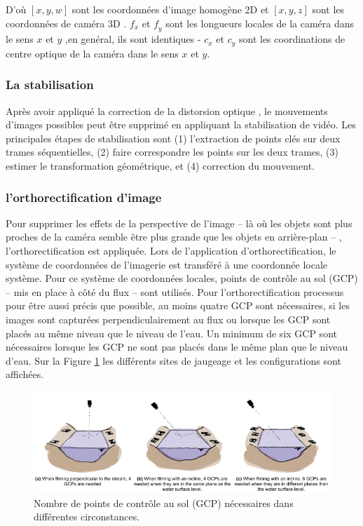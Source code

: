 \documentclass[
]{article}
\begin{document}
D'où \([𝑥, 𝑦, 𝑤]\) sont les coordonnées d'image homogène 2D et \([x, y , z]\) sont les coordonnées de caméra 3D . \(f_𝑥\) et \(𝑓_𝑦\) sont les longueurs locales de la caméra dans le sens \(𝑥\) et \(𝑦\) ,en genéral, ils sont identiques - \(𝑐_𝑥\) et \(𝑐_𝑦\) sont les coordinations de centre optique de la caméra dans le sens \(𝑥\) et \(𝑦\).

\hypertarget{la-stabilisation}{%
\subsubsection*{La stabilisation}\label{la-stabilisation}}

Après avoir appliqué la correction de la distorsion optique , le mouvements d'images possibles
peut être supprimé en appliquant la stabilisation de vidéo. Les principales étapes de
stabilisation sont (1) l'extraction de points clés sur deux trames séquentielles,
(2) faire correspondre les points sur les deux trames, (3) estimer le
transformation géométrique, et (4) correction du mouvement.

\hypertarget{lorthorectification-dimage}{%
\subsubsection*{l'orthorectification d'image}\label{lorthorectification-dimage}}

Pour supprimer les effets de la perspective de l'image -- là où les objets sont plus proches
de la caméra semble être plus grande que les objets en arrière-plan -- ,
l'orthorectification est appliquée. Lors de l'application d'orthorectification,
le système de coordonnées de l'imagerie est transféré à une coordonnée locale
système. Pour ce système de coordonnées locales, points de contrôle au sol (GCP) --
mis en place à côté du flux -- sont utilisés. Pour l'orthorectification
processus pour être aussi précis que possible, au moins quatre GCP sont nécessaires, si
les images sont capturées perpendiculairement au flux ou lorsque les GCP
sont placés au même niveau que le niveau de l'eau. Un minimum de six
GCP sont nécessaires lorsque les GCP ne sont pas placés dans le même plan que le
niveau d'eau. Sur la Figure \ref{fig:fortho} les différents sites de jaugeage
et les configurations sont affichées.



\begin{figure}
\includegraphics[width=1\linewidth]{images/ortho} \caption{Nombre de points de contrôle au sol (GCP) nécessaires dans différentes circonstances.}\label{fig:fortho}
\end{figure}
\end{document}
